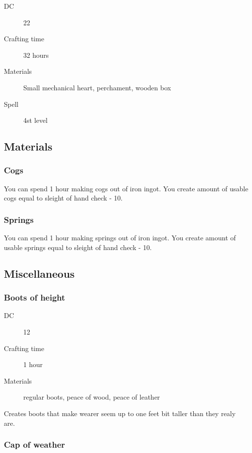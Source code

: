\begin{description}
\item [DC] 22 \arcana
\item [Crafting time] 32 hours
\item [Materials] Small mechanical heart, perchament, wooden box
\item [Spell] 4st level
\end{description}

\subsection{Materials}

\subsubsection{Cogs}

You can spend 1 hour making cogs out of iron ingot. You create amount of usable cogs equal to sleight of hand check - 10.

\subsubsection{Springs}

You can spend 1 hour making springs out of iron ingot. You create amount of usable springs equal to sleight of hand check - 10.

\subsection{Miscellaneous}

\subsubsection{Boots of height}

\begin{description}
\item [DC] 12 \sleightofhands
\item [Crafting time] 1 hour
\item [Materials] regular boots, peace of wood, peace of leather
\end{description}

Creates boots that make wearer seem up to one feet bit taller than they realy are.

\subsubsection{Cap of weather}

